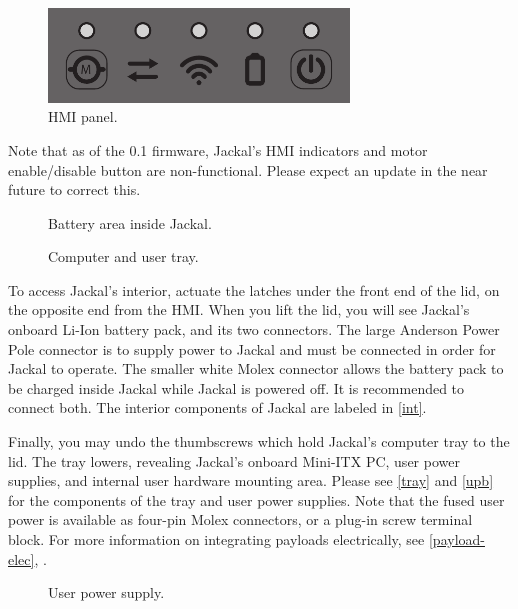 \documentclass[]{clearpath-manual}
\begin{document}
\begin{figure}[ht]
  \centering
  \includegraphics[width=8.0cm]{hmi.pdf}
  \caption{HMI panel.}
  \label{hmi}
\end{figure}

\begin{warning}
Note that as of the 0.1 firmware, Jackal's HMI indicators and motor enable/disable button are
non-functional. Please expect an update in the near future to correct this.
\end{warning}

\begin{figure}[pt]
  \centering
  \def\svgwidth{12cm}
  
  \caption{Battery area inside Jackal.}
  \label{int}
\end{figure}

\begin{figure}[pb]
  \centering
  \def\svgwidth{14cm}
  
  \caption{Computer and user tray.}
  \label{tray}
\end{figure}

To access Jackal's interior, actuate the latches under the front end of the lid, on the opposite end from
the HMI. When you lift the lid, you will see Jackal's onboard Li-Ion battery pack, and its two connectors.
The large Anderson Power Pole connector is to supply power to Jackal and must be connected in order for
Jackal to operate. The smaller white Molex connector allows the battery pack to be charged inside Jackal 
while Jackal is powered off. It is recommended to connect both. The interior components of Jackal are
labeled in \autoref{int}.

Finally, you may undo the thumbscrews which hold Jackal's computer tray to the lid. The tray lowers,
revealing Jackal's onboard Mini-ITX PC, user power supplies, and internal user hardware mounting area.
Please see \autoref{tray} and \autoref{upb} for the components of the tray and user power supplies.
Note that the fused user power is available as four-pin Molex connectors, or a plug-in screw terminal
block. For more information on integrating payloads electrically, see \autoref{payload-elec},
.

\begin{figure}[hb]
  \centering
  \def\svgwidth{15cm}
  
  \caption{User power supply.}
  \label{upb}
\end{figure}
\end{document}
